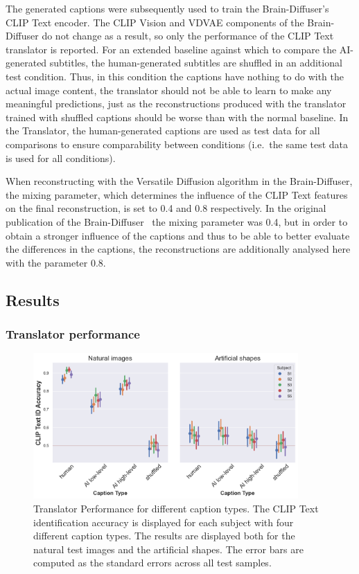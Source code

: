The generated captions were subsequently used to train the Brain-Diffuser's CLIP Text encoder. The CLIP Vision and VDVAE components of the Brain-Diffuser do not change as a result, so only the performance of the CLIP Text translator is reported. For an extended baseline against which to compare the AI-generated subtitles, the human-generated subtitles are shuffled in an additional test condition. Thus, in this condition the captions have nothing to do with the actual image content, the translator should not be able to learn to make any meaningful predictions, just as the reconstructions produced with the translator trained with shuffled captions should be worse than with the normal baseline. In the Translator, the human-generated captions are used as test data for all comparisons to ensure comparability between conditions (i.e.\ the same test data is used for all conditions). 

When reconstructing with the Versatile Diffusion algorithm in the Brain-Diffuser, the mixing parameter, which determines the influence of the CLIP Text features on the final reconstruction, is set to 0.4 and 0.8 respectively. In the original publication of the Brain-Diffuser~\cite{ozcelikNaturalSceneReconstruction2023} the mixing parameter was 0.4, but in order to obtain a stronger influence of the captions and thus to be able to better evaluate the differences in the captions, the reconstructions are additionally analysed here with the parameter 0.8.


\subsection{Results}

\subsubsection{Translator performance}

\begin{figure}[ht]
    \centering
    \includegraphics[width=0.9\textwidth]{plots/aicap_translator.png}
    \caption[Experiment 2: Translator performance]{Translator Performance for different caption types. The CLIP Text identification accuracy is displayed for each subject with four different caption types. The results are displayed both for the natural test images and the artificial shapes. The error bars are computed as the standard errors across all test samples.}\label{fig:aicap_translator}
\end{figure}

